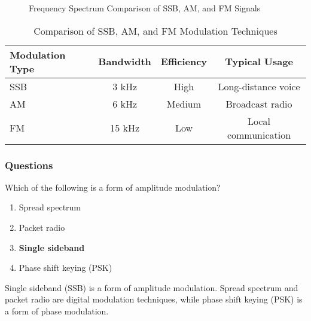 \begin{figure}[h]
    \centering
    \caption{Frequency Spectrum Comparison of SSB, AM, and FM Signals}
    \label{fig:ssb-spectrum}
\end{figure}

\begin{table}[h]
    \centering
    \begin{tabular}{|l|c|c|c|}
        \hline
        \textbf{Modulation Type} & \textbf{Bandwidth} & \textbf{Efficiency} & \textbf{Typical Usage} \\
        \hline
        SSB & 3 kHz & High & Long-distance voice \\
        AM & 6 kHz & Medium & Broadcast radio \\
        FM & 15 kHz & Low & Local communication \\
        \hline
    \end{tabular}
    \caption{Comparison of SSB, AM, and FM Modulation Techniques}
    \label{tab:modulation-comparison}
\end{table}

\subsubsection*{Questions}

\begin{tcolorbox}[colback=gray!10!white,colframe=black!75!black,title={T8A01}]
    Which of the following is a form of amplitude modulation?
    \begin{enumerate}[label=\Alph*),noitemsep]
        \item Spread spectrum
        \item Packet radio
        \item \textbf{Single sideband}
        \item Phase shift keying (PSK)
    \end{enumerate}
\end{tcolorbox}
Single sideband (SSB) is a form of amplitude modulation. Spread spectrum and packet radio are digital modulation techniques, while phase shift keying (PSK) is a form of phase modulation.

